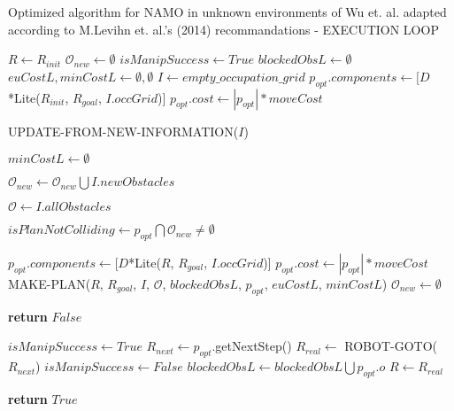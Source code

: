 \begin{algorithm}[H]

  \caption{Optimized algorithm for NAMO in unknown environments of Wu et. al. adapted according to M.Levihn et. al.'s (2014) recommandations - EXECUTION LOOP}

  \label{alg:02-levihn-makeandexecuteplan}

  \begin{algorithmic}[1]


      \State $R \gets R_{init}$ \label{lst:line:init1}
      \State $\mathcal{O}_{new} \gets \emptyset$
      \State $isManipSuccess \gets True$
      \State $blockedObsL \gets \emptyset$
      \State $euCostL, minCostL \gets \emptyset, \emptyset$ \label{lst:line:init2}
      \State $I \gets empty\_occupation\_grid$
      \State $p_{opt}.components \gets [D$*Lite($R_{init}$, $R_{goal}$, $I.occGrid$)]
      \State $p_{opt}.cost \gets |p_{opt}| * moveCost$


        \State UPDATE-FROM-NEW-INFORMATION($I$)

         \label{lst:line:second_update-from-new-information_note}
          \State $minCostL \gets \emptyset$
        \EndIf

        \State $\mathcal{O}_{new} \gets \mathcal{O}_{new} \bigcup I.newObstacles$

        \State $\mathcal{O} \gets I.allObstacles$ \label{lst:line:allobstacles}

        \State $isPlanNotColliding \gets p_{opt} \bigcap \mathcal{O}_{new} \neq \emptyset$

          \State $p_{opt}.components \gets [D$*Lite($R$, $R_{goal}$, $I.occGrid$)]
          \State $p_{opt}.cost \gets |p_{opt}| * moveCost$
          \State MAKE-PLAN($R$, $R_{goal}$, $I$, $\mathcal{O}$, $blockedObsL$, $p_{opt}$, $euCostL$, $minCostL$)
          \State $\mathcal{O}_{new} \gets \emptyset$
        \EndIf

         \label{lst:line:exec1}
          \State \textbf{return} $False$
        \EndIf \label{lst:line:exec1bis}

        \State $isManipSuccess \gets True$ \label{lst:line:ismanipsuccess}
        \State $R_{next} \gets p_{opt}$.getNextStep() \label{lst:line:exec2bis}
        \State $R_{real} \gets$ ROBOT-GOTO($R_{next}$)
          \State $isManipSuccess \gets False$
          \State $blockedObsL \gets blockedObsL \bigcup p_{opt}.o$
        \EndIf
        \State $R \gets R_{real}$ \label{lst:line:exec2}

      \EndWhile

      \State \textbf{return} $True$

    \EndProcedure

  \end{algorithmic}
\end{algorithm}
